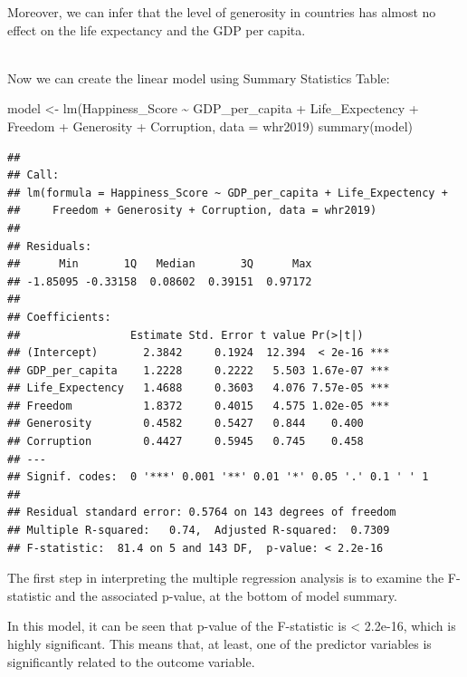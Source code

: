\documentclass[
]{article}
\newenvironment{Shaded}{\begin{snugshade}}{\end{snugshade}}
\newcommand{\AttributeTok}[1]{\textcolor[rgb]{0.77,0.63,0.00}{#1}}
\newcommand{\FunctionTok}[1]{\textcolor[rgb]{0.00,0.00,0.00}{#1}}
\newcommand{\NormalTok}[1]{#1}
\newcommand{\OtherTok}[1]{\textcolor[rgb]{0.56,0.35,0.01}{#1}}
\newcommand{\SpecialCharTok}[1]{\textcolor[rgb]{0.00,0.00,0.00}{#1}}
\begin{document}
Moreover, we can infer that the level of generosity in countries has
almost no effect on the life expectancy and the GDP per capita.\\
\strut \\

Now we can create the linear model using Summary Statistics Table:

\begin{Shaded}
\begin{Highlighting}[]
\NormalTok{model }\OtherTok{\textless{}{-}} \FunctionTok{lm}\NormalTok{(Happiness\_Score }\SpecialCharTok{\textasciitilde{}}\NormalTok{ GDP\_per\_capita }\SpecialCharTok{+}\NormalTok{ Life\_Expectency }\SpecialCharTok{+}\NormalTok{ Freedom }\SpecialCharTok{+} 
\NormalTok{              Generosity }\SpecialCharTok{+}\NormalTok{ Corruption, }\AttributeTok{data =}\NormalTok{ whr2019)}
\FunctionTok{summary}\NormalTok{(model)}
\end{Highlighting}
\end{Shaded}

\begin{verbatim}
## 
## Call:
## lm(formula = Happiness_Score ~ GDP_per_capita + Life_Expectency + 
##     Freedom + Generosity + Corruption, data = whr2019)
## 
## Residuals:
##      Min       1Q   Median       3Q      Max 
## -1.85095 -0.33158  0.08602  0.39151  0.97172 
## 
## Coefficients:
##                 Estimate Std. Error t value Pr(>|t|)    
## (Intercept)       2.3842     0.1924  12.394  < 2e-16 ***
## GDP_per_capita    1.2228     0.2222   5.503 1.67e-07 ***
## Life_Expectency   1.4688     0.3603   4.076 7.57e-05 ***
## Freedom           1.8372     0.4015   4.575 1.02e-05 ***
## Generosity        0.4582     0.5427   0.844    0.400    
## Corruption        0.4427     0.5945   0.745    0.458    
## ---
## Signif. codes:  0 '***' 0.001 '**' 0.01 '*' 0.05 '.' 0.1 ' ' 1
## 
## Residual standard error: 0.5764 on 143 degrees of freedom
## Multiple R-squared:   0.74,  Adjusted R-squared:  0.7309 
## F-statistic:  81.4 on 5 and 143 DF,  p-value: < 2.2e-16
\end{verbatim}

The first step in interpreting the multiple regression analysis is to
examine the F-statistic and the associated p-value, at the bottom of
model summary.

In this model, it can be seen that p-value of the F-statistic is
\textless{} 2.2e-16, which is highly significant. This means that, at
least, one of the predictor variables is significantly related to the
outcome variable.
\end{document}
